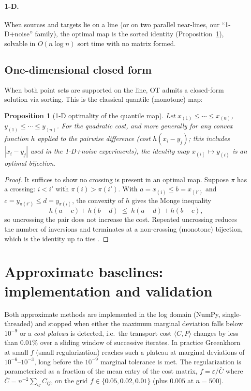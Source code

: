 \documentclass[11pt]{article}
\newtheorem{proposition}{Proposition}
\theoremstyle{remark}
\begin{document}
\paragraph{1-D.} When sources and targets lie on a line (or on two parallel
near-lines, our ``1-D+noise'' family), the optimal map is the sorted
identity (Proposition~\ref{prop:1d}), solvable in $O(n\log n)$ sort time
with no matrix formed.

\subsection{One-dimensional closed form}
When both point sets are supported on the line, OT admits a closed-form
solution via sorting. This is the classical quantile (monotone) map:

\begin{proposition}[1-D optimality of the quantile map]
\label{prop:1d}
Let $x_{(1)}\le\cdots\le x_{(n)}$, $y_{(1)}\le\cdots\le y_{(n)}$. For the
quadratic cost, and more generally for any convex function $h$ applied to
the pairwise difference (cost $h(x_i-y_j)$; this includes $|x_i-y_j|$ used
in the 1-D+noise experiments), the identity map $x_{(i)}\mapsto y_{(i)}$
is \emph{an} optimal bijection.
\end{proposition}
\begin{proof}
It suffices to show no crossing is present in an optimal map. Suppose
$\pi$ has a crossing: $i<i'$ with $\pi(i)>\pi(i')$. With
$a=x_{(i)}\le b=x_{(i')}$ and $c=y_{\pi(i')}\le d=y_{\pi(i)}$, the
convexity of $h$ gives the Monge inequality
\[
h(a-c)+h(b-d) \;\le\; h(a-d)+h(b-c),
\]
so uncrossing the pair does not increase the cost. Repeated uncrossing
reduces the number of inversions and terminates at a non-crossing
(monotone) bijection, which is the identity up to ties
\cite[Ch.~2]{villani2009}.
\end{proof}

\section{Approximate baselines: implementation and validation}
\label{sec:approx}

Both approximate methods are implemented in the log domain (NumPy,
single-threaded) and stopped when either the maximum marginal deviation
falls below $10^{-9}$ or a \emph{cost plateau} is detected, i.e.\ the
transport cost $\langle C,P\rangle$ changes by less than $0.01\%$ over a
sliding window of successive iterates. In practice Greenkhorn at small
$f$ (small regularization) reaches such a plateau at marginal deviations
of $10^{-6}$--$10^{-3}$, long before the $10^{-9}$ marginal tolerance is
met. The regularization
is parameterized as a fraction of the mean entry of the cost matrix,
$f=\varepsilon/\overline{C}$ where $\overline{C}=n^{-2}\sum_{ij}C_{ij}$, on
the grid $f\in\{0.05,0.02,0.01\}$ (plus $0.005$ at $n=500$).
\end{document}
